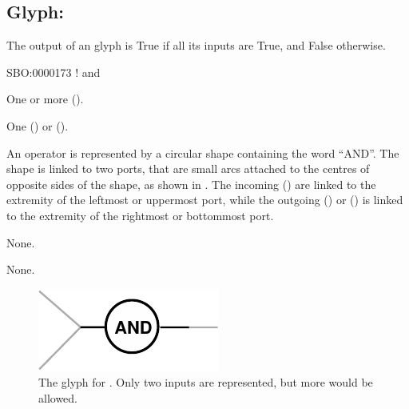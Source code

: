\subsection{Glyph: }
\label{sec:and}


The output of an  glyph is True if all its inputs are True, and False otherwise.



\begin{glyphDescription}

\glyphSboTerm
SBO:0000173 ! and


\glyphIncoming One or more  ().



\glyphOutgoing
One  () or  ().


\glyphContainer
An  operator is represented by a circular shape containing the word ``AND''.
The shape is linked to two ports, that are small arcs attached to the centres of opposite sides of the shape, as shown in .
The incoming  () are linked to the extremity of the leftmost or uppermost port, while the outgoing  () or  () is linked to the extremity of the rightmost or bottommost port.

\glyphLabel
None.

\glyphAux
None.

\end{glyphDescription}

\begin{figure}[H]
  \centering
  \includegraphics{images/build/and.pdf}
  \caption{The \PD glyph for . Only two inputs are represented, but more would be allowed.}
  \label{fig:and}
\end{figure}

%
